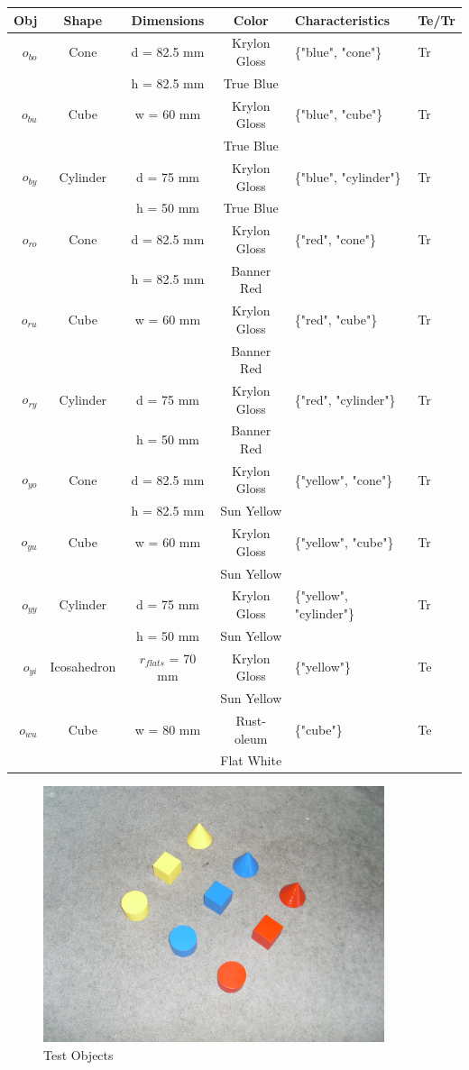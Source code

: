 \documentclass{article}
\begin{document}
\begin{tabular}{r | c c c | l | l }
	Obj & Shape & Dimensions & Color & Characteristics & Te/Tr \\
	\hline
	$ o_{bo} $ & Cone & d = 82.5 mm & Krylon Gloss & \{"blue", "cone"\} & Tr \\
	& & h = 82.5 mm & True Blue & & \\
	$ o_{bu} $ & Cube & w = 60 mm & Krylon Gloss & \{"blue", "cube"\} & Tr \\
	& & & True Blue & & \\
	$ o_{by} $ & Cylinder & d = 75 mm & Krylon Gloss & \{"blue", "cylinder"\} & Tr \\
	& & h = 50 mm & True Blue & & \\
	$ o_{ro} $ & Cone & d = 82.5 mm & Krylon Gloss & \{"red", "cone"\} & Tr \\
	& & h = 82.5 mm & Banner Red & & \\
	$ o_{ru} $ & Cube & w = 60 mm & Krylon Gloss & \{"red", "cube"\} & Tr \\
	& & & Banner Red & & \\
	$ o_{ry} $ & Cylinder & d = 75 mm & Krylon Gloss & \{"red", "cylinder"\} & Tr \\
	& & h = 50 mm & Banner Red & & \\
	$ o_{yo} $ & Cone & d = 82.5 mm & Krylon Gloss & \{"yellow", "cone"\} & Tr \\
	& & h = 82.5 mm & Sun Yellow & & \\
	$ o_{yu} $ & Cube & w = 60 mm & Krylon Gloss & \{"yellow", "cube"\} & Tr \\
	& & & Sun Yellow & & \\
	$ o_{yy} $ & Cylinder & d = 75 mm & Krylon Gloss & \{"yellow", "cylinder"\} & Tr \\
	& & h = 50 mm & Sun Yellow & & \\
	$ o_{yi} $ & Icosahedron & $ r_{flats} $ = 70 mm & Krylon Gloss & \{"yellow"\} & Te \\
	& & & Sun Yellow & & \\
	$ o_{wu} $ & Cube & w = 80 mm & Rust-oleum & \{"cube"\} & Te \\
	& & & Flat White & & \\
\end{tabular}

\begin{figure}[h!]
	\centering
	\includegraphics[width=100mm]{test_objects.JPG}
	\caption{Test Objects}
\end{figure}
\end{document}
